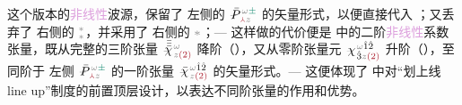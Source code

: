 这个版本的\textcolor{Plum}{非线性}\textcolor{NavyBlue}{波源}，保留了  左侧的 $\Xint{\mathcolor{gray}{-}}{25}{\bar{P}}^{\;\! \mathcolor{gray}{\omega} \textcolor{PineGreen}{\pm}}_{\;\! \textcolor{Maroon}{\Yup} \mathcolor{gray}{z}}$ 的矢量形式，以便直接代入 ；又丢弃了  右侧的 ${}^{\mathcolor{gray}{*}}_{\mathcolor{gray}{*}}$，并采用了  右侧的 $\mathcolor{gray}{*}$；--- 这样做的代价便是  中的二阶\textcolor{Plum}{非线性}系数张量，既从完整的三阶张量 $\Xint{{}^{}_{\mathcolor{gray}{-}}}{23}{\bar{\bar{\bar{\chi}}}}^{\;\! \mathcolor{gray}{\omega} }_{\;\! \mathcolor{gray}{z} \textcolor{Maroon}{(2)} }$ 降阶（），又从零阶张量元 $\Xint{{}^{}_{\mathcolor{gray}{-}}}{23}{\chi}^{\;\! \mathcolor{gray}{\omega} \hat{1} \hat{2} }_{\;\! \hat{3} \mathcolor{gray}{z} \textcolor{Maroon}{(2)} }$ 升阶（），至同阶于  左侧 $\Xint{\mathcolor{gray}{-}}{25}{\bar{P}}^{\;\! \mathcolor{gray}{\omega} \textcolor{PineGreen}{\pm}}_{\;\! \textcolor{Maroon}{\Yup} \mathcolor{gray}{z}}$ 的一阶张量 $\Xint{{}^{}_{\mathcolor{gray}{-}}}{23}{\bar{\chi}}^{\;\! \mathcolor{gray}{\omega} \hat{1} \hat{2} }_{\;\! \mathcolor{gray}{z} \textcolor{Maroon}{(2)} }$ 的矢量形式。--- 这便体现了  中对“划上线 line up”制度的前置顶层设计，以表达不同阶张量的作用和优势。

